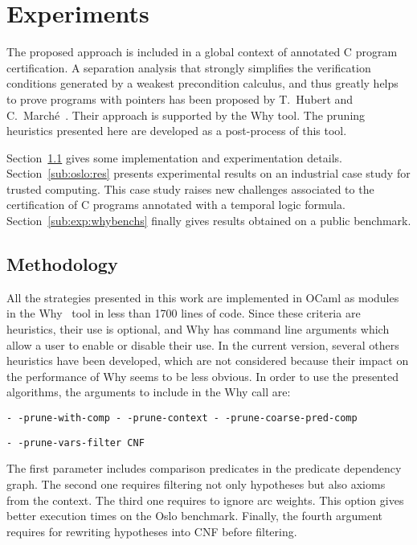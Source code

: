 \documentclass{acm_proc_article-sp}
\theoremstyle{nonumberplain}
\begin{document}
\section{Experiments}\label{sec:strat}
The proposed approach is included in a global context of annotated C
program certification. A separation analysis that strongly simplifies
the verification conditions generated by a weakest precondition
calculus, and thus greatly helps to prove programs with pointers has
been proposed by T.~Hubert and C.~March{\'e}~\cite{hubert07hav}. Their
approach is supported by the Why tool. The pruning heuristics presented
here are developed as a post-process of this tool.



Section~\ref{sub:exp:method} gives some implementation and
experimentation details. Section~\ref{sub:oslo:res} presents
experimental results on an industrial case study for trusted computing.
This case study raises new challenges associated to the certification
of C programs annotated with a temporal logic formula.
Section~\ref{sub:exp:whybenchs} finally gives results obtained on a
public benchmark.


 
\subsection{Methodology}\label{sub:exp:method}
All the strategies presented in this work are implemented in OCaml as
modules in the Why~\cite{filliatre07cav} tool in less than 1700 lines
of code. Since these criteria are heuristics, their use is optional,
and Why has command line arguments which allow a user to enable or
disable their use. In the current version, several others heuristics
have been developed, which are not considered because their impact on
the performance of Why seems to be less obvious. In order to use the
presented algorithms, the arguments to include in the Why call are:

\centerline{
  \scriptsize
  \texttt{-\,-prune-with-comp -\,-prune-context  -\,-prune-coarse-pred-comp}}
\centerline{
  \scriptsize
  \texttt{-\,-prune-vars-filter CNF}}
  

The first parameter includes comparison predicates in the predicate
dependency graph. The second one requires filtering not only hypotheses
but also axioms from the context. The third one requires to ignore arc
weights. This option gives better execution times on the Oslo
benchmark. Finally, the fourth argument requires for rewriting
hypotheses into CNF before filtering.
\end{document}

